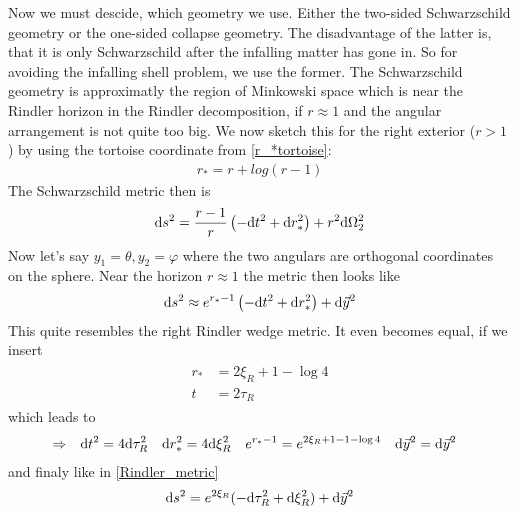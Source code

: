 Now we must descide, which geometry we use. Either the two-sided Schwarzschild geometry or the one-sided collapse geometry. The disadvantage of the latter is, that it is only Schwarzschild after the infalling matter has gone in. So for avoiding the infalling shell problem, we use the former. 
The Schwarzschild geometry is approximatly the region of Minkowski space which is near the Rindler horizon in the Rindler decomposition, if $r \approx 1$ and the angular arrangement is not quite too big. We now sketch this for the right exterior ($r>1$) by using the tortoise coordinate from \eqref{r_*tortoise}:
	\begin{align*}
		r_*=r + log(r-1)
	\end{align*}
The Schwarzschild metric then is
	\begin{align}
		\mathrm{d} s^2=\frac{r-1}{r}\left(-\mathrm{d} t^2 + \mathrm{d} r^2_*\right) + r^2 \mathrm{d} \Omega^2_2
	\end{align}
Now let's say $y_1=\theta, y_2=\varphi$ where the two angulars are orthogonal coordinates on the sphere. Near the horizon $r\approx1$ the metric then looks like 
	\begin{align}
		\mathrm{d} s^2 \approx e^{r_* - 1} \left(-\mathrm{d} t^2 + \mathrm{d} r^2_*\right) + \mathrm{d} \vec{y}^2
	\end{align}
This quite resembles the right Rindler wedge metric. It even becomes equal, if we insert
	\begin{align}
		\begin{split}
			r_*&= 2\xi_R + 1 - \log 4 \\
			t &= 2\tau_R
		\end{split}
	\end{align}
which leads to
	\begin{align*}
		&\Rightarrow &
		\mathrm{d} t^2 &= 4 \mathrm{d} \tau_R^2 & \mathrm{d} r_*^2 &= 4 \mathrm{d} \xi_R^2 &e^{r_* -1} &= e^{2\xi_R + 1 - 1 - \log 4} & \mathrm{d} \vec{y}^2 &= \mathrm{d} \vec{y}^2
	\end{align*}
and finaly like in \eqref{Rindler_metric}
	\begin{align*}
		\mathrm{d} s^2 = e^{2\xi_R} (-\mathrm{d} \tau_R^2 + \mathrm{d} \xi_R^2) + \mathrm{d} \vec{y}^2 
	\end{align*}
